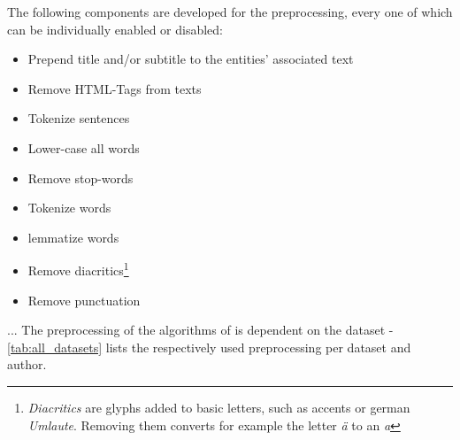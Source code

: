 The following components are developed for the preprocessing, every one of which can be individually enabled or disabled:
\begin{itemize}
	\item Prepend title and/or subtitle to the entities' associated text 
	\item Remove HTML-Tags from texts 
	\item Tokenize sentences 
	\item Lower-case all words
	\item Remove stop-words
	\item Tokenize words
	\item \Gls{lemma}tize words
	\item Remove diacritics\footnote{\emph{Diacritics} are glyphs added to basic letters, such as accents or german \emph{Umlaute}. Removing them converts for example the letter \emph{ä} to an \emph{a}}
	\item Remove punctuation 
\end{itemize}





... The preprocessing of the algorithms of \mainalgos is dependent on the dataset - \autoref{tab:all_datasets} lists the respectively used preprocessing per dataset and author.


